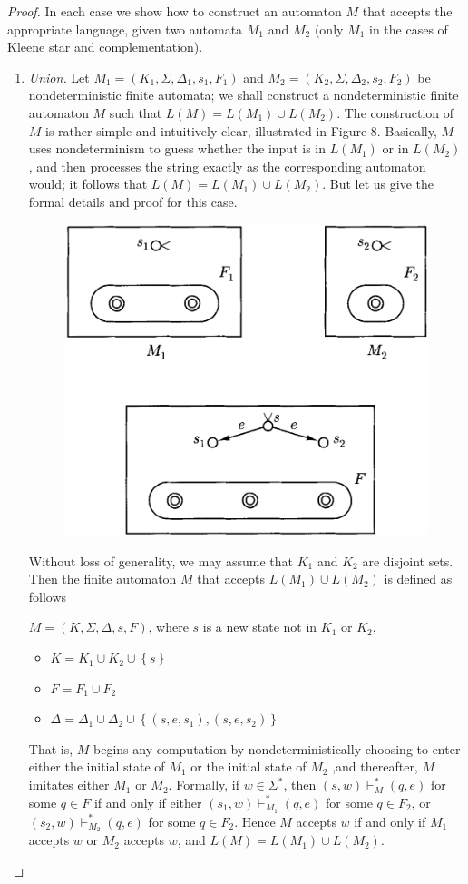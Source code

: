 \begin{proof}
  In each case we show how to construct an automaton $M$ that accepts the appropriate language, given two automata $M_1$ and $M_2$ (only $M_1$ in the cases of Kleene star and complementation).

  \begin{enumerate}[label=(\alph*)]
    \item \textit{Union.}
    Let $M_1 = (K_1, \Sigma, \Delta_1, s_1, F_1)$ and $M_2 = (K_2, \Sigma, \Delta_2, s_2, F_2)$ be nondeterministic finite automata; we shall construct a nondeterministic finite automaton $M$ such that $L(M) = L(M_1) \cup L(M_2)$. The construction of $M$ is rather simple and intuitively clear, illustrated in Figure 8. Basically, $M$ uses nondeterminism to guess whether the input is in $L(M_1)$ or in $L(M_2)$, and then processes the string exactly as the corresponding automaton would; it follows that $L(M) = L(M_1) \cup L(M_2)$. But let us give the formal details and proof for this case.
    \begin{figure}[h!]
      \centering
      \includegraphics[width=.5\textwidth]{img/Fig2.11.png}
      \caption{}
    \end{figure}
    Without loss of generality, we may assume that $K_1$ and $K_2$ are disjoint sets. Then the finite automaton $M$ that accepts $L(M_1) \cup L(M_2)$ is defined as follows
    
    \quad $M = (K, \Sigma, \Delta, s, F)$, where $s$ is a new state not in $K_1$ or $K_2$,
    \begin{itemize}
      \item $K = K_1 \cup K_2 \cup \left\{ s \right\}$
      \item $F = F_1 \cup F_2$
      \item $\Delta = \Delta_1 \cup \Delta_2 \cup \left\{ (s,e,s_1),(s,e,s_2) \right\}$
    \end{itemize}
    That is, $M$ begins any computation by nondeterministically choosing to enter either the initial state of $M_1$ or the initial state of $M_2$ ,and thereafter, $M$ imitates either $M_1$ or $M_2$. Formally, if $w \in \Sigma^*$, then $(s, w) \vdash^*_M (q, e)$ for some $q \in F$ if and only if either $(s_1, w) \vdash^*_{M_1} (q, e)$ for some $q \in F_2$, or $(s_2, w) \vdash^*_{M_2} (q, e)$ for some $q \in F_2$. Hence $M$ accepts $w$ if and only if $M_1$ accepts $w$ or $M_2$ accepts $w$, and $L(M) = L(M_1) \cup L(M_2)$.


\end{enumerate}
\end{proof}
